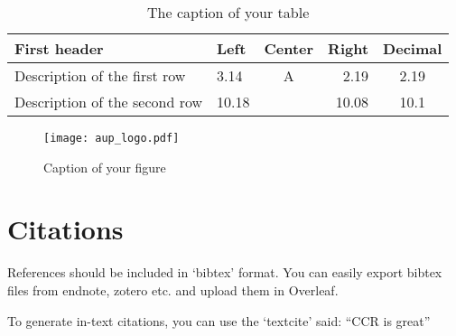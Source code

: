 \begin{table}[t] 
    \centering
    \begin{tabularx}{\textwidth}{XlcrS}
    \toprule
       First header & Left & Center & Right & {Decimal} \\
    \midrule
    Description of the first row & 3.14 & A & 2.19 & 2.19\\
    Description of the second row & 10.18 & & 10.08 & 10.1\\
    \bottomrule
    \end{tabularx}
    \caption{The caption of your table}
    \label{tab:my_label}
\end{table}

\begin{figure}[b]
    \centering
    \texttt{[image: aup\_logo.pdf]}
    \caption{Caption of your figure}
    \label{fig:my_label}
\end{figure}


\section{Citations}

References should be included in  ‘bibtex’ format. 
You can easily export bibtex files from endnote, zotero etc. and upload them in Overleaf.

To generate in-text citations, you can use the `textcite'  \textcite{ccrintro} said: ``CCR is great'' \parencite[p.~1]{ccrintro}
